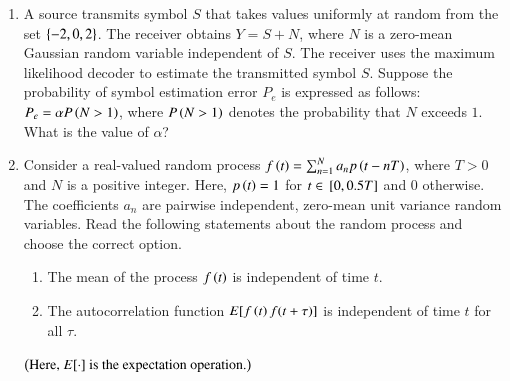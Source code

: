 \documentclass[journal,12pt,onecolumn]{IEEEtran}
\theoremstyle{remark}
\begin{document}
\begin{enumerate}
\hfill{}

\begin{enumerate}
\end{enumerate}

\item A source transmits symbol $S$ that takes values uniformly at random from the set $\left\{-2,0,2\right\}$. The receiver obtains $Y = S + N$, where $N$ is a zero-mean Gaussian random variable independent of $S$. The receiver uses the maximum likelihood decoder to estimate the transmitted symbol $S$. Suppose the probability of symbol estimation error $P_e$ is expressed as follows: $P_e = \alpha P\left(N > 1\right)$, where $P\left(N > 1\right)$ denotes the probability that $N$ exceeds $1$. What is the value of $\alpha$?

\hfill{}

\begin{enumerate}
\end{enumerate}

\item Consider a real-valued random process $f\left(t\right) = \sum_{n=1}^{N} a_n p\left(t - nT\right)$, where $T > 0$ and $N$ is a positive integer. Here, $p\left(t\right) = 1$ for $t \in {}\left[0, 0.5T\right]$ and $0$ otherwise. The coefficients $a_n$ are pairwise independent, zero-mean unit variance random variables. Read the following statements about the random process and choose the correct option.
\begin{enumerate}[label=(\roman*)]
    \item The mean of the process $f\left(t\right)$ is independent of time $t$.
    \item The autocorrelation function $E[ f\left(t\right)f(t + \tau)]$ is independent of time $t$ for all $\tau$.
\end{enumerate}
$\left(\text{Here, } E[\cdot] \text{ is the expectation operation.}\right)$


\end{enumerate}
\end{document}
